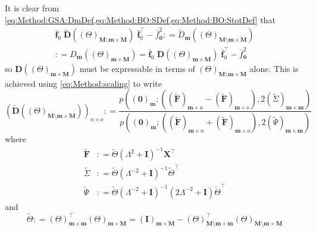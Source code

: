 \documentclass[preprint,12pt]{elsarticle}
\newcommand*{\M}[1]{\ensuremath{#1}\xspace}
\newcommand*{\vr}[1]{\M{\mathbf{#1}}}
\newcommand*{\deq}{\M{\mathrel{\mathop:}=}}
\begin{document}
            It is clear from \cref{eq:Method:GSA:DmDef,eq:Method:BO:SDef,eq:Method:BO:StotDef} that
            \begin{multline*}
                \bar{\vr{f}}_{0} \; \tilde{\vr{D}}((\Theta)_{\vr{M}\setminus\vr{m}\times\vr{M}}) 
                \; \bar{\vr{f}}_{0}^{\intercal} - \bar{f}_{\vr{0}}^{2}
                \deq \tilde{D}_{\vr{m}}((\Theta)_{\vr{M}\setminus\vr{m}\times\vr{M}}) \\
                \deq D_{\vr{m}}((\Theta)_{\vr{m}\times\vr{M}})
                = \bar{\vr{f}}_{0} \; \vr{D}((\Theta)_{\vr{m}\times\vr{M}}) 
                \; \bar{\vr{f}}_{0}^{\intercal} - \bar{f}_{\vr{0}}^{2}
            \end{multline*}
            so $\vr{D}((\Theta)_{\vr{m}\times\vr{M}})$ must be expressable in terms of $(\Theta)_{\vr{M}\setminus\vr{m}\times\vr{M}}$ alone.
            This is achieved using \cref{eq:Method:scaling} to write
            \begin{equation} \label{eq:Method:BO:DtDef}
                (\tilde{\vr{D}}((\Theta)_{\vr{M}\setminus\vr{m}\times\vr{M}}))_{n \times o} \deq
                \frac 
                {p\!\left((\vr{0})_{\vr{m}} ; \left((\tilde{\vr{F}})_{\vr{m}\times n}-(\tilde{\vr{F}})_{\vr{m}\times o}\right), 2(\tilde{\Sigma})_{\vr{m}\times\vr{m}}\right)}
                {p\!\left((\vr{0})_{\vr{m}} ; \left((\tilde{\vr{F}})_{\vr{m}\times n}+(\tilde{\vr{F}})_{\vr{m}\times o}\right), 2(\tilde{\Psi})_{\vr{m}\times\vr{m}}\right)}
            \end{equation}
            where
            \begin{equation} \label{eq:Method:BO:FbtSigmatDef}
                \begin{aligned}
                    \tilde{\vr{F}} &\deq 
                        \tilde{\Theta} \left(\Lambda^{2} + \vr{I}\right)^{-1} \vr{X}^{\intercal} \\
                    \tilde{\Sigma} &\deq 
                        \tilde{\Theta} \left(\Lambda^{-2} + \vr{I}\right)^{-1} \tilde{\Theta}^{\intercal} \\
                    \tilde{\Psi} &\deq \tilde{\Theta} \left(\Lambda^{-2}+\vr{I}\right)^{-1}\left(2\Lambda^{-2}+\vr{I}\right) 
                    \tilde{\Theta}^{\intercal}
                \end{aligned}                    
            \end{equation}
            and
            \begin{equation} \label{eq:Method:BO:ThetatDef}
                \tilde{\Theta} \deq (\Theta)^{\intercal}_{\vr{m}\times\vr{m}}(\Theta)_{\vr{m}\times\vr{M}} = 
                (\vr{I})_{\vr{m}\times\vr{M}} - (\Theta)^{\intercal}_{\vr{M}\setminus\vr{m}\times\vr{m}}
                (\Theta)_{\vr{M}\setminus\vr{m}\times\vr{M}}
            \end{equation}
\end{document}
